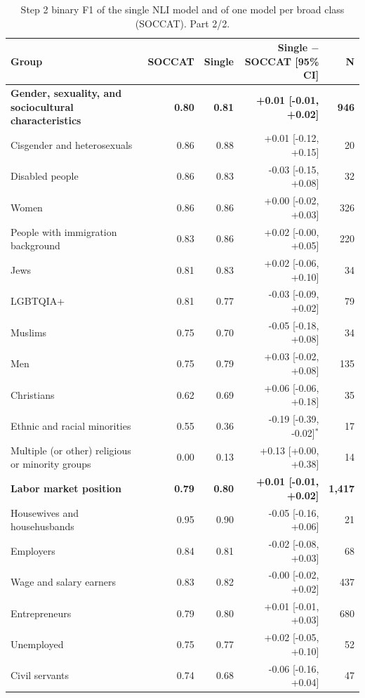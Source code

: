 \begin{table}[htbp]
\centering
\scriptsize
\begin{threeparttable}
\caption{Step 2 binary F1 of the single NLI model and of one model per broad class (SOCCAT). Part 2/2.}
\label{tab:single-nli-part2}
\begin{tabular}{l rr r r}
\toprule
Group & SOCCAT & Single & Single $-$ SOCCAT [95\% CI] & N \\
\midrule
\textbf{Gender, sexuality, and sociocultural characteristics} & \textbf{0.80} & \textbf{0.81} & \textbf{+0.01 [-0.01, +0.02]} & \textbf{946} \\
\quad Cisgender and heterosexuals & 0.86 & 0.88 & +0.01 [-0.12, +0.15] & 20 \\
\quad Disabled people & 0.86 & 0.83 & -0.03 [-0.15, +0.08] & 32 \\
\quad Women & 0.86 & 0.86 & +0.00 [-0.02, +0.03] & 326 \\
\quad People with immigration background & 0.83 & 0.86 & +0.02 [-0.00, +0.05] & 220 \\
\quad Jews & 0.81 & 0.83 & +0.02 [-0.06, +0.10] & 34 \\
\quad LGBTQIA+ & 0.81 & 0.77 & -0.03 [-0.09, +0.02] & 79 \\
\quad Muslims & 0.75 & 0.70 & -0.05 [-0.18, +0.08] & 34 \\
\quad Men & 0.75 & 0.79 & +0.03 [-0.02, +0.08] & 135 \\
\quad Christians & 0.62 & 0.69 & +0.06 [-0.06, +0.18] & 35 \\
\quad Ethnic and racial minorities & 0.55 & 0.36 & -0.19 [-0.39, -0.02]$^{*}$ & 17 \\
\quad Multiple (or other) religious or minority groups & 0.00 & 0.13 & +0.13 [+0.00, +0.38] & 14 \\
\addlinespace
\textbf{Labor market position} & \textbf{0.79} & \textbf{0.80} & \textbf{+0.01 [-0.01, +0.02]} & \textbf{1,417} \\
\quad Housewives and househusbands & 0.95 & 0.90 & -0.05 [-0.16, +0.06] & 21 \\
\quad Employers & 0.84 & 0.81 & -0.02 [-0.08, +0.03] & 68 \\
\quad Wage and salary earners & 0.83 & 0.82 & -0.00 [-0.02, +0.02] & 437 \\
\quad Entrepreneurs & 0.79 & 0.80 & +0.01 [-0.01, +0.03] & 680 \\
\quad Unemployed & 0.75 & 0.77 & +0.02 [-0.05, +0.10] & 52 \\
\quad Civil servants & 0.74 & 0.68 & -0.06 [-0.16, +0.04] & 47 \\

\end{tabular}
\end{threeparttable}
\end{table}
